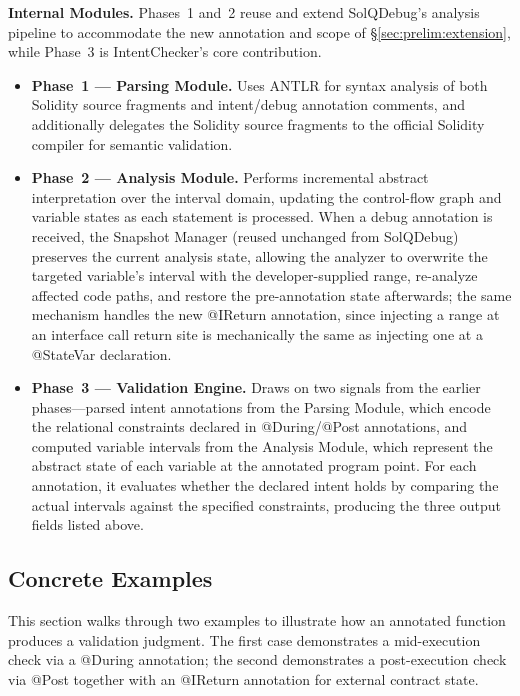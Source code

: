 \documentclass[pdflatex,sn-basic]{sn-jnl}%
\theoremstyle{thmstyleone}%
\theoremstyle{thmstyletwo}%
\theoremstyle{thmstylethree}%
\begin{document}
\smallskip
\noindent\textbf{Internal Modules.}
Phases~1 and~2 reuse and extend SolQDebug's analysis pipeline to accommodate the new annotation and scope of §\ref{sec:prelim:extension}, while Phase~3 is IntentChecker's core contribution.
\begin{itemize}
    \item \textbf{Phase~1 --- Parsing Module.} Uses ANTLR for syntax analysis of both Solidity source fragments and intent/debug annotation comments, and additionally delegates the Solidity source fragments to the official Solidity compiler for semantic validation.
    \item \textbf{Phase~2 --- Analysis Module.} Performs incremental abstract interpretation over the interval domain, updating the control-flow graph and variable states as each statement is processed. When a debug annotation is received, the Snapshot Manager (reused unchanged from SolQDebug) preserves the current analysis state, allowing the analyzer to overwrite the targeted variable's interval with the developer-supplied range, re-analyze affected code paths, and restore the pre-annotation state afterwards; the same mechanism handles the new @IReturn annotation, since injecting a range at an interface call return site is mechanically the same as injecting one at a @StateVar declaration.
    \item \textbf{Phase~3 --- Validation Engine.} Draws on two signals from the earlier phases---parsed intent annotations from the Parsing Module, which encode the relational constraints declared in @During/@Post annotations, and computed variable intervals from the Analysis Module, which represent the abstract state of each variable at the annotated program point. For each annotation, it evaluates whether the declared intent holds by comparing the actual intervals against the specified constraints, producing the three output fields listed above.
\end{itemize}

\subsection{Concrete Examples}

This section walks through two examples to illustrate how an annotated function produces a validation judgment.
The first case demonstrates a mid-execution check via a @During annotation; the second demonstrates a post-execution check via @Post together with an @IReturn annotation for external contract state.
\end{document}
